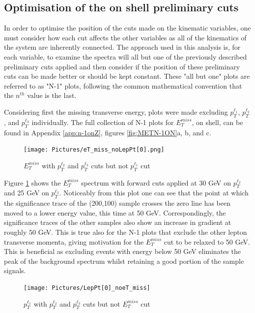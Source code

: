 \subsection{Optimisation of the on shell preliminary cuts}
In order to optimise the position of the cuts made on the kinematic variables, one must consider how each cut affects the other variables as all of the kinematics of the system are inherently connected.
The approach used in this analysis is, for each variable, to examine the spectra will all but one of the previously described preliminary cuts applied and then consider if the position of these preliminary cuts can be made better or should be kept constant.
These "all but one" plots are referred to as "N-1" plots, following the common mathematical convention that the $n^{th}$ value is the last.

Considering first the missing transverse energy, plots were made excluding $p_{T}^{\ell_{1}}$, $p_{T}^{\ell_{2}}$, and $p_{T}^{\ell_{3}}$ individually.
The full collection of N-1 plots for $E_{T}^{miss}$, on shell, can be found in Appendix \ref{app:n-1onZ}, figures \ref{fig:METN-1ON}a, b, and c.

\begin{figure}[H] %
   \centering
   \texttt{[image: Pictures/eT\_miss\_noLepPt[0].png]} 
   \caption{$E_{T}^{miss}$ with $p_{T}^{\ell_{2}}$ and $p_{T}^{\ell_{3}}$ cuts but not $p_{T}^{\ell_{1}}$ cut}
   \label{fig:METONN-1LepPt[0]}
\end{figure}

Figure \ref{fig:METONN-1LepPt[0]} shows the $E_{T}^{miss}$ spectrum with forward cuts applied at 30 GeV on $p_{T}^{\ell_{2}}$ and 25 GeV on $p_{T}^{\ell_{3}}$. 
Noticeably from this plot one can see that the point at which the significance trace of the (200,100) sample crosses the zero line has been moved to a lower energy value, this time at 50 GeV.
Correspondingly, the significance traces of the other samples also show an increase in gradient at roughly 50 GeV.
This is true also for the N-1 plots that exclude the other lepton transverse momenta, giving motivation for the $E_{T}^{miss}$ cut to be relaxed to 50 GeV.
This is beneficial as excluding events with energy below 50 GeV eliminates the peak of the background spectrum whilst retaining a good portion of the sample signals.

\begin{figure}[H] %
   \centering
   \texttt{[image: Pictures/LepPt[0]\_noeT\_miss]} 
   \caption{$p_{T}^{\ell_{1}}$ with $p_{T}^{\ell_{2}}$ and $p_{T}^{\ell_{3}}$ cuts but not $E_{T}^{miss}$ cut}
   \label{fig:LepPt[0]ONN-1MET}
\end{figure}

